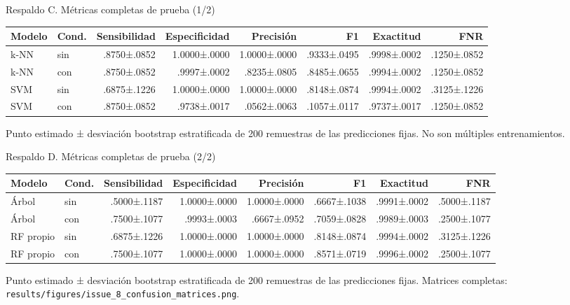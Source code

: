 \documentclass[aspectratio=169,10pt]{beamer}
\begin{document}
\begin{frame}{Respaldo C. Métricas completas de prueba (1/2)}
  \centering
  \fontsize{6.2}{7.4}\selectfont
  \renewcommand{\arraystretch}{1.2}
  \begin{tabular}{llrrrrrr}
    \toprule
    Modelo & Cond. & Sensibilidad & Especificidad & Precisión & F1 & Exactitud & FNR \\
    \midrule
    k-NN & sin & .8750±.0852 & 1.0000±.0000 & 1.0000±.0000 & .9333±.0495 & .9998±.0002 & .1250±.0852 \\
    k-NN & con & .8750±.0852 & .9997±.0002 & .8235±.0805 & .8485±.0655 & .9994±.0002 & .1250±.0852 \\
    SVM & sin & .6875±.1226 & 1.0000±.0000 & 1.0000±.0000 & .8148±.0874 & .9994±.0002 & .3125±.1226 \\
    SVM & con & .8750±.0852 & .9738±.0017 & .0562±.0063 & .1057±.0117 & .9737±.0017 & .1250±.0852 \\
    \bottomrule
  \end{tabular}

  \vspace{1em}
  \small Punto estimado ± desviación bootstrap estratificada de 200 remuestras de
  las predicciones fijas. No son múltiples entrenamientos.
\end{frame}

\begin{frame}{Respaldo D. Métricas completas de prueba (2/2)}
  \centering
  \fontsize{6.2}{7.4}\selectfont
  \renewcommand{\arraystretch}{1.2}
  \begin{tabular}{llrrrrrr}
    \toprule
    Modelo & Cond. & Sensibilidad & Especificidad & Precisión & F1 & Exactitud & FNR \\
    \midrule
    Árbol & sin & .5000±.1187 & 1.0000±.0000 & 1.0000±.0000 & .6667±.1038 & .9991±.0002 & .5000±.1187 \\
    Árbol & con & .7500±.1077 & .9993±.0003 & .6667±.0952 & .7059±.0828 & .9989±.0003 & .2500±.1077 \\
    RF propio & sin & .6875±.1226 & 1.0000±.0000 & 1.0000±.0000 & .8148±.0874 & .9994±.0002 & .3125±.1226 \\
    RF propio & con & .7500±.1077 & 1.0000±.0000 & 1.0000±.0000 & .8571±.0719 & .9996±.0002 & .2500±.1077 \\
    \bottomrule
  \end{tabular}

  \vspace{1em}
  \small Punto estimado ± desviación bootstrap estratificada de 200 remuestras de
  las predicciones fijas. Matrices completas: \texttt{results/figures/issue\_8\_confusion\_matrices.png}.
\end{frame}
\end{document}
